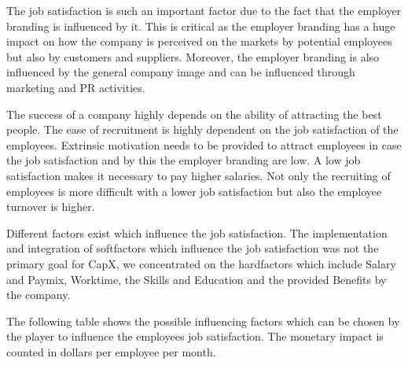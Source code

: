 The job satisfaction is such an important factor due to the fact that the employer branding is influenced by it. This is critical as the employer branding has a huge impact on how the company is perceived on the markets by potential employees but also by customers and suppliers. Moreover, the employer branding is also influenced by the general company image and can be influenced through marketing and PR activities. 

The success of a company highly depends on the ability of attracting the best people. The ease of recruitment is highly dependent on the job satisfaction of the employees. Extrinsic motivation needs to be provided to attract employees in case the job satisfaction and by this the employer branding are low. A low job satisfaction makes it necessary to pay higher salaries. Not only the recruiting of employees is more difficult with a lower job satisfaction but also the employee turnover is higher. \cite{frederiksen2016}

Different factors exist which influence the job satisfaction. \cite{Kapur} The implementation and integration of softfactors which influence the job satisfaction was not the primary goal for CapX, we concentrated on the hardfactors which include Salary and Paymix, Worktime, the Skills and Education and the provided Benefits by the company. 

The following table shows the possible influencing factors which can be chosen by the player to influence the employees job satisfaction. The monetary impact is counted in dollars per employee per month. 

